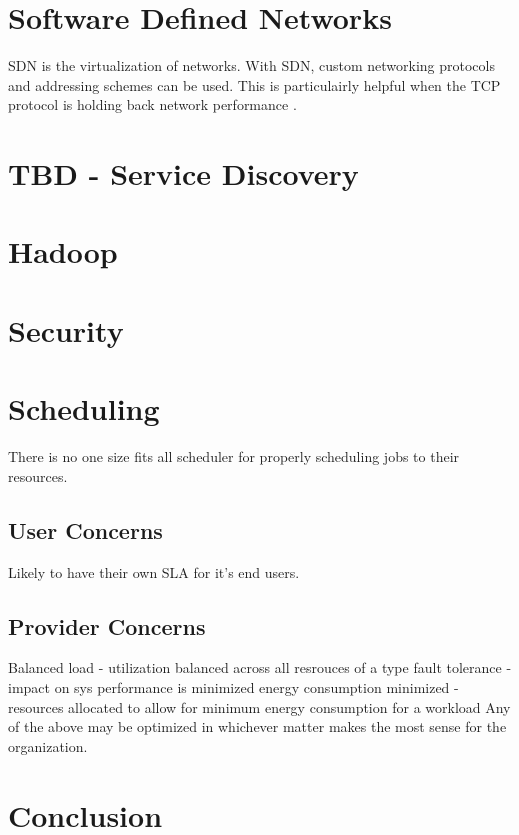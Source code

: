 \documentclass[fullapage,12pt]{article}
\begin{document}
\section{Software Defined Networks}

SDN is the virtualization of networks. With SDN, custom networking protocols and addressing schemes can be used. This is particulairly helpful when the TCP protocol is holding back network performance \cite{Jennings2015}.

\section{TBD - Service Discovery}

\section{Hadoop}

\section{Security}

\section{Scheduling}

There is no one size fits all scheduler for properly scheduling jobs to their resources. \cite{Jennings2015}



\subsection{User Concerns}

\cite{Jennings2015}
Likely to have their own SLA for it's end users.


\subsection{Provider Concerns}


\cite{Jennings2015}
Balanced load - utilization balanced across all resrouces of a type
fault tolerance - impact on sys performance is minimized
energy consumption minimized - resources allocated to allow for minimum energy consumption for a workload
Any of the above may be optimized in whichever matter makes the most sense for the organization.


\section{Conclusion}





\end{document}
